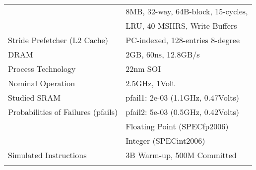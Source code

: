 \begin{otherlanguage}{english}
\begin{table}[h]
\begin{tabularx}{\textwidth}{ >{\centering\arraybackslash}X || >{\centering\arraybackslash}X }
            \multirow{2}{*}{L2 Cache}                                       & 8MB, 32-way, 64B-block, 15-cycles, \\
                                                                            & LRU, 40 MSHRS, Write Buffers       \\ \hline
            
            Stride Prefetcher (L2 Cache)                                    & PC-indexed, 128-entries 8-degree   \\ \hline
            
            DRAM                                                            & 2GB, 60ns, 12.8GB/s                \\ \hline
            
            Process Technology                                              & 22nm SOI                           \\ \hline
            
            Nominal Operation                                               & 2.5GHz, 1Volt                      \\ \hline
            
            Studied SRAM                                                    & pfail1: 2e-03 (1.1GHz, 0.47Volts)  \\ \cline{2-2}
            Probabilities of Failures (pfails) \cite{lorente2014analyzing}  & pfail2: 5e-03 (0.5GHz, 0.42Volts)  \\ \hline
            
            \multirow{2}{*}{\spec Benchmarks \cite{henning2006spec}}        & 17 Floating Point (SPECfp2006)     \\
                                                                            & 12 Integer (SPECint2006)           \\ \hline
            
            Simulated Instructions                                          & 3B Warm-up, 500M Committed         \\ \hline
            
            \Xhline{4\arrayrulewidth}
        \end{tabularx}
        \caption{ \gem}
        \label{tab:chap6_gem5parameters}
    \end{table}
\end{otherlanguage}